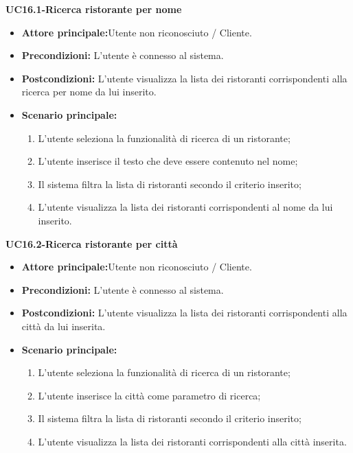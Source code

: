 \textbf{UC16.1-Ricerca ristorante per nome}
\begin{itemize}
\item \textbf{Attore principale:}Utente non riconosciuto / Cliente.
\item \textbf{Precondizioni:} L'utente è connesso al sistema.
\item \textbf{Postcondizioni:} L'utente visualizza la lista dei ristoranti corrispondenti
alla ricerca per nome da lui inserito.
\item \textbf{Scenario principale:}
\begin{enumerate}
    \item L'utente seleziona la funzionalità di ricerca di un ristorante;
    \item L'utente inserisce il testo che deve essere contenuto nel nome;
    \item Il sistema filtra la lista di ristoranti secondo il criterio inserito;
    \item L'utente visualizza la lista dei ristoranti corrispondenti al nome da lui inserito.
\end{enumerate}
\end{itemize}

\textbf{UC16.2-Ricerca ristorante per città}
\begin{itemize}
\item \textbf{Attore principale:}Utente non riconosciuto / Cliente.
\item \textbf{Precondizioni:} L'utente è connesso al sistema.
\item \textbf{Postcondizioni:} L'utente visualizza la lista dei ristoranti corrispondenti alla città da lui inserita.
\item \textbf{Scenario principale:}
\begin{enumerate}
    \item L'utente seleziona la funzionalità di ricerca di un ristorante;
    \item L'utente inserisce la città come parametro di ricerca;
    \item Il sistema filtra la lista di ristoranti secondo il criterio inserito;
    \item L'utente visualizza la lista dei ristoranti corrispondenti alla città inserita.
\end{enumerate}
\end{itemize}

